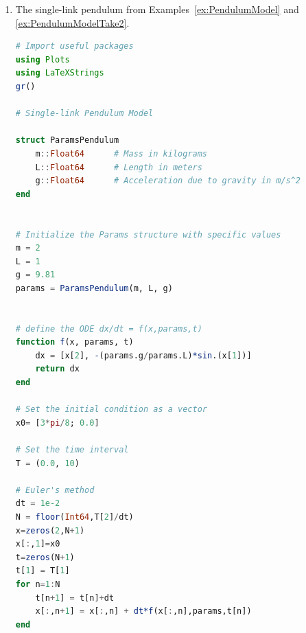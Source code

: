 \begin{enumerate}
\renewcommand{\labelenumi}{(\alph{enumi})}
\setlength{\itemsep}{.2cm}
\item The single-link pendulum from Examples~\ref{ex:PendulumModel} and \ref{ex:PendulumModelTake2}.

\begin{lstlisting}[language=Julia,style=mystyle]
# Import useful packages
using Plots 
using LaTeXStrings
gr()

# Single-link Pendulum Model

struct ParamsPendulum
    m::Float64      # Mass in kilograms
    L::Float64      # Length in meters
    g::Float64      # Acceleration due to gravity in m/s^2
end


# Initialize the Params structure with specific values
m = 2
L = 1
g = 9.81
params = ParamsPendulum(m, L, g)


# define the ODE dx/dt = f(x,params,t)
function f(x, params, t) 
    dx = [x[2], -(params.g/params.L)*sin.(x[1])]
    return dx
end

# Set the initial condition as a vector
x0= [3*pi/8; 0.0]

# Set the time interval
T = (0.0, 10) 

# Euler's method
dt = 1e-2
N = floor(Int64,T[2]/dt)
x=zeros(2,N+1)
x[:,1]=x0
t=zeros(N+1)
t[1] = T[1]
for n=1:N
    t[n+1] = t[n]+dt
    x[:,n+1] = x[:,n] + dt*f(x[:,n],params,t[n])
end


\end{lstlisting}
\end{enumerate}
